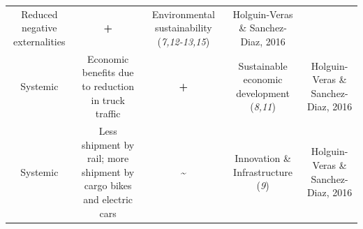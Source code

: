 \documentclass[
]{book}
\begin{document}
\begin{longtable}[]{@{}ccccc@{}}
\begin{minipage}[t]{0.16\columnwidth}
Reduced negative externalities\strut
\end{minipage} & \begin{minipage}[t]{0.17\columnwidth}\centering
\textbf{+}\strut
\end{minipage} & \begin{minipage}[t]{0.17\columnwidth}\centering
Environmental sustainability (\emph{7,12-13,15})\strut
\end{minipage} & \begin{minipage}[t]{0.17\columnwidth}\centering
Holguin-Veras \& Sanchez-Diaz, 2016\strut
\end{minipage}\tabularnewline
\begin{minipage}[t]{0.17\columnwidth}\centering
Systemic\strut
\end{minipage} & \begin{minipage}[t]{0.16\columnwidth}\centering
Economic benefits due to reduction in truck traffic\strut
\end{minipage} & \begin{minipage}[t]{0.17\columnwidth}\centering
\textbf{+}\strut
\end{minipage} & \begin{minipage}[t]{0.17\columnwidth}\centering
Sustainable economic development (\emph{8,11})\strut
\end{minipage} & \begin{minipage}[t]{0.17\columnwidth}\centering
Holguin-Veras \& Sanchez-Diaz, 2016\strut
\end{minipage}\tabularnewline
\begin{minipage}[t]{0.17\columnwidth}\centering
Systemic\strut
\end{minipage} & \begin{minipage}[t]{0.16\columnwidth}\centering
Less shipment by rail; more shipment by cargo bikes and electric cars\strut
\end{minipage} & \begin{minipage}[t]{0.17\columnwidth}\centering
\textbf{\textasciitilde{}}\strut
\end{minipage} & \begin{minipage}[t]{0.17\columnwidth}\centering
Innovation \& Infrastructure (\emph{9})\strut
\end{minipage} & \begin{minipage}[t]{0.17\columnwidth}\centering
Holguin-Veras \& Sanchez-Diaz, 2016\strut
\end{minipage}\tabularnewline
\bottomrule
\end{longtable}
\end{document}

